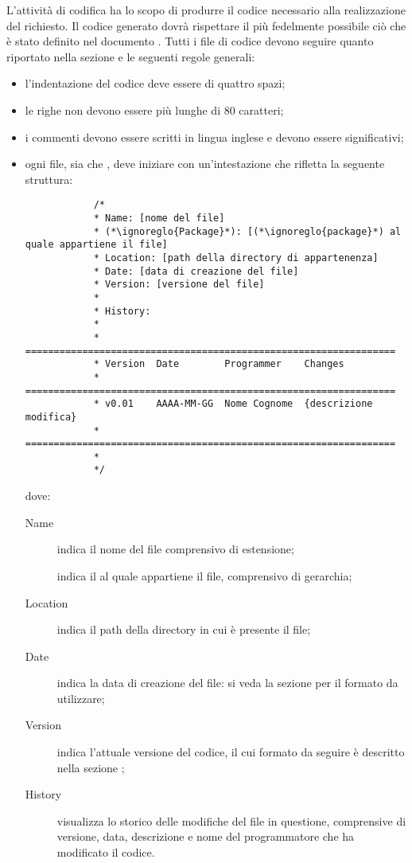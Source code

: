  \label{sec:codifica}
L'attività di codifica ha lo scopo di produrre il codice necessario alla realizzazione del  richiesto. Il codice generato dovrà rispettare il più fedelmente possibile ciò che è stato definito nel documento .
	Tutti i file di codice devono seguire quanto riportato nella sezione  e le seguenti regole generali:
	\begin{itemize}
		\item l'indentazione del codice deve essere di quattro spazi;
		\item le righe non devono essere più lunghe di 80 caratteri;
		\item i commenti devono essere scritti in lingua inglese e devono essere significativi;
		\item ogni file, sia  che , deve iniziare con un'intestazione che rifletta la seguente struttura:
		\begin{lstlisting}
			/*
			* Name: [nome del file]
			* (*\ignoreglo{Package}*): [(*\ignoreglo{package}*) al quale appartiene il file]
			* Location: [path della directory di appartenenza]
			* Date: [data di creazione del file]
			* Version: [versione del file]
			* 
			* History:
			* 
			* =================================================================
			* Version  Date        Programmer    Changes
			* =================================================================
			* v0.01    AAAA-MM-GG  Nome Cognome  {descrizione modifica}
			* =================================================================
			*
			*/
		\end{lstlisting}
		dove:
		\begin{description}
			\item[Name] indica il nome del file comprensivo di estensione;
			\item[] indica il  al quale appartiene il file, comprensivo di gerarchia;
			\item[Location] indica il path della directory in cui è presente il file;
			\item[Date] indica la data di creazione del file: si veda la sezione  per il formato da utilizzare;
			\item[Version] indica l'attuale versione del codice, il cui formato da seguire è descritto nella sezione ;
			\item[History] visualizza lo storico delle modifiche del file in questione, comprensive di versione, data, descrizione e nome del programmatore che ha modificato il codice.
		\end{description}
	\end{itemize}
